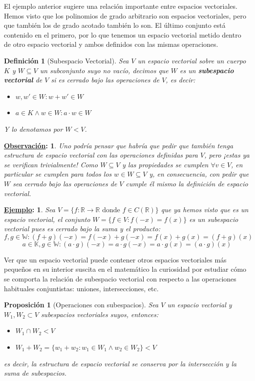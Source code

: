 \documentclass[10pt,a4paper,openright]{book}
\theoremstyle{break}
\newtheorem*{defi}{Definición}
\newtheorem*{prop}{Proposición}
\newtheorem*{obs}{\underline{Observación}:}
\newtheorem*{ej}{\underline{Ejemplo}:}
\begin{document}
El ejemplo anterior sugiere una relación importante entre espacios vectoriales. Hemos visto que los polinomios de grado arbitrario son espacios vectoriales, pero que también los de grado acotado también lo son. El último conjunto está contenido en el primero, por lo que tenemos un espacio vectorial metido dentro de otro espacio vectorial y ambos definidos con las mismas operaciones.

\begin{defi}[Subespacio Vectorial]
Sea $V$ un espacio vectorial sobre un cuerpo $K$ y $W\subseteq V$ un subconjunto suyo no vacío, decimos que $W$ es un \textbf{subespacio vectorial} de $V$ si es cerrado bajo las operaciones de $V$, es decir:
\begin{itemize}
\item $w, w'\in W: w+w'\in W$
\item $a\in K\wedge w\in W: a\cdot w\in W$
\end{itemize}
Y lo denotamos por $W < V$.
\end{defi}

\begin{obs}
Uno podría pensar que habría que pedir que también tenga estructura de espacio vectorial con las operaciones definidas para $V$, pero ¡estas ya se verifican trivialmente! Como $W\subseteq V$ y las propiedades se cumplen $\forall v\in V$, en particular se cumplen para todos los $w\in W\subseteq V$ y, en consecuencia, con pedir que $W$ sea cerrado bajo las operaciones de $V$ cumple él mismo la definición de espacio vectorial.
\end{obs}

\begin{ej}
Sea $V= \{f:\mathbb R\rightarrow \mathbb R \mbox{ donde } f\in C(\mathbb{R}) \}$ que ya hemos visto que es un espacio vectorial, el conjunto $W=\{f\in V : f(-x)=f(x) \}$ es un subespacio vectorial pues es cerrado bajo la suma y el producto:
$$f,g\in\mathbb W: (f+g)(-x)=f(-x)+g(-x)=f(x)+g(x)=(f+g)(x)$$
$$a\in \mathbb K, g\in\mathbb W: (a\cdot g)(-x)=a\cdot g(-x)=a\cdot g(x)=(a\cdot g)(x)$$
\end{ej}

Ver que un espacio vectorial puede contener otros espacios vectoriales más pequeños en su interior suscita en el matemático la curiosidad por estudiar cómo se comporta la relación de subespacio vectorial con respecto a las operaciones habituales conjuntistas: uniones, intersecciones, etc.

\begin{prop}[Operaciones con subespacios]
Sea $V$ un espacio vectorial y $W_1, W_2\subset V$ subespacios vectoriales suyos, entonces:
\begin{itemize}
\item $W_1\cap W_2 < V$
\item $W_1+W_2=\{w_1+w_2: w_1\in W_1\wedge w_2\in W_2\}< V$
\end{itemize}
es decir, la estructura de espacio vectorial se conserva por la intersección y la suma de subespacios.
\end{prop}
\end{document}
